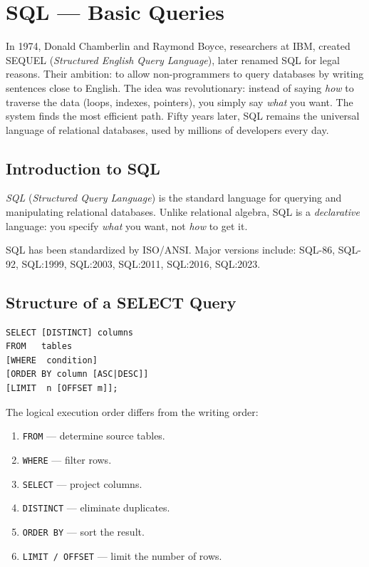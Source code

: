\chapter{SQL --- Basic Queries}
\label{ch:sql_basics}

In 1974, Donald Chamberlin and Raymond Boyce, researchers at IBM, created SEQUEL (\emph{Structured English Query Language}), later renamed SQL for legal reasons. Their ambition: to allow non-programmers to query databases by writing sentences close to English. The idea was revolutionary: instead of saying \emph{how} to traverse the data (loops, indexes, pointers), you simply say \emph{what} you want. The system finds the most efficient path. Fifty years later, SQL remains the universal language of relational databases, used by millions of developers every day.

\section{Introduction to SQL}

\begin{definition}[SQL]
\emph{SQL} (\emph{Structured Query Language}) is the standard language
for querying and manipulating relational databases. Unlike relational
algebra, SQL is a \emph{declarative} language: you specify \emph{what}
you want, not \emph{how} to get it.
\end{definition}

SQL has been standardized by ISO/ANSI. Major versions include:
SQL-86, SQL-92, SQL:1999, SQL:2003, SQL:2011, SQL:2016, SQL:2023.

\section{Structure of a SELECT Query}

\begin{keyformulas}[title=\textbf{General SELECT Syntax}]
\begin{verbatim}
SELECT [DISTINCT] columns
FROM   tables
[WHERE  condition]
[ORDER BY column [ASC|DESC]]
[LIMIT  n [OFFSET m]];
\end{verbatim}
\end{keyformulas}

The logical execution order differs from the writing order:
\begin{enumerate}
    \item \texttt{FROM} --- determine source tables.
    \item \texttt{WHERE} --- filter rows.
    \item \texttt{SELECT} --- project columns.
    \item \texttt{DISTINCT} --- eliminate duplicates.
    \item \texttt{ORDER BY} --- sort the result.
    \item \texttt{LIMIT / OFFSET} --- limit the number of rows.
\end{enumerate}

